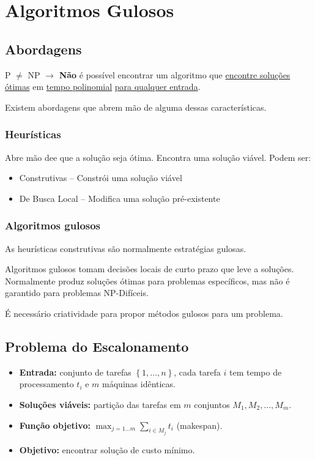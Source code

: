 \chapter{Algoritmos Gulosos}

\section{Abordagens}

P $\neq$ NP $\to$ \textbf{Não} é possível encontrar um algoritmo que \underline{encontre soluções ótimas} em \underline{tempo polinomial} \underline{para qualquer entrada}.

Existem abordagens que abrem mão de alguma dessas características.

\subsection{Heurísticas}

Abre mão dee que a solução seja ótima. Encontra uma solução viável. Podem ser:

\begin{itemize}
    \item Construtivas -- Constrói uma solução viável
    \item De Busca Local -- Modifica uma solução pré-existente
\end{itemize}

\subsection{Algoritmos gulosos}

As heurísticas construtivas são normalmente estratégias gulosas.

Algoritmos gulosos tomam decisões locais de curto prazo que leve a soluções. Normalmente produz soluções ótimas para problemas específicos, mas não é garantido para problemas NP-Difíceis.

É necessário criatividade para propor métodos gulosos para um problema.

\section{Problema do Escalonamento}

\begin{itemize}
    \item \textbf{Entrada:} conjunto de tarefas $\left\{ 1,\dots,n\right\}$, cada tarefa $i$ tem tempo de processamento $t_i$ e $m$ máquinas idênticas.
    \item \textbf{Soluções viáveis:} partição das tarefas em $m$ conjuntos $M_1, M_2, \dots, M_m$.
    \item \textbf{Função objetivo:} $\max_{j=1\dots m}\sum_{i \in M_j}t_i$ (makespan).
    \item \textbf{Objetivo:} encontrar solução de custo mínimo.
\end{itemize}

